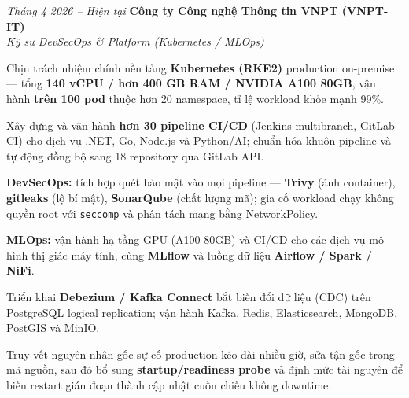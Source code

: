 \begin{twocolentry}{\textit{Tháng 4 2026 -- Hiện tại}}
    \textbf{Công ty Công nghệ Thông tin VNPT (VNPT-IT)} \\[4pt]
    \textit{Kỹ sư DevSecOps \& Platform (Kubernetes / MLOps)}
\end{twocolentry}
\begin{onecolentry}
    \begin{highlights}
        \item Chịu trách nhiệm chính nền tảng \textbf{Kubernetes (RKE2)} production on-premise --- tổng \textbf{140 vCPU / hơn 400 GB RAM / NVIDIA A100 80GB}, vận hành \textbf{trên 100 pod} thuộc hơn 20 namespace, tỉ lệ workload khỏe mạnh 99\%.
        \item Xây dựng và vận hành \textbf{hơn 30 pipeline CI/CD} (Jenkins multibranch, GitLab CI) cho dịch vụ .NET, Go, Node.js và Python/AI; chuẩn hóa khuôn pipeline và tự động đồng bộ sang 18 repository qua GitLab API.
        \item \textbf{DevSecOps:} tích hợp quét bảo mật vào mọi pipeline --- \textbf{Trivy} (ảnh container), \textbf{gitleaks} (lộ bí mật), \textbf{SonarQube} (chất lượng mã); gia cố workload chạy không quyền root với \texttt{seccomp} và phân tách mạng bằng NetworkPolicy.
        \item \textbf{MLOps:} vận hành hạ tầng GPU (A100 80GB) và CI/CD cho các dịch vụ mô hình thị giác máy tính, cùng \textbf{MLflow} và luồng dữ liệu \textbf{Airflow / Spark / NiFi}.
        \item Triển khai \textbf{Debezium / Kafka Connect} bắt biến đổi dữ liệu (CDC) trên PostgreSQL logical replication; vận hành Kafka, Redis, Elasticsearch, MongoDB, PostGIS và MinIO.
        \item Truy vết nguyên nhân gốc sự cố production kéo dài nhiều giờ, sửa tận gốc trong mã nguồn, sau đó bổ sung \textbf{startup/readiness probe} và định mức tài nguyên để biến restart gián đoạn thành cập nhật cuốn chiếu không downtime.
    \end{highlights}
\end{onecolentry}
\vspace{0.2 cm}

